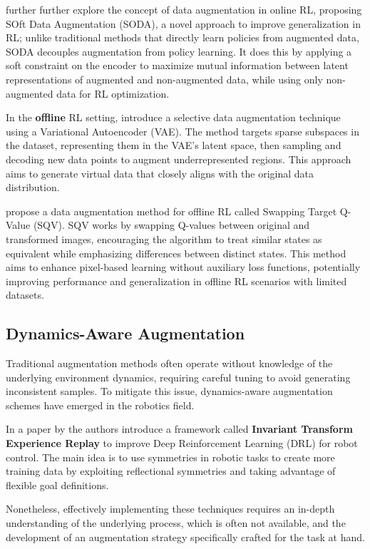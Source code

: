 \cite{hansen2021} further further explore the concept of data augmentation
in online RL, proposing SOft Data Augmentation (SODA),
a novel approach to improve generalization in RL;
unlike traditional methods that directly learn policies
from augmented data, SODA decouples augmentation from policy learning.
It does this by applying a soft constraint on the encoder to
maximize mutual information between latent representations of
augmented and non-augmented data, while using only non-augmented
data for RL optimization.

In the \textbf{offline} RL setting, \cite{han2022}
introduce a selective data augmentation technique
using a Variational Autoencoder (VAE).
The method targets sparse subspaces in the dataset,
representing them in the VAE's latent space,
then sampling and decoding new data points to augment
underrepresented regions. This approach aims to generate
virtual data that closely aligns with the original data distribution.

\cite{joo2022} propose a data augmentation method for offline RL
called Swapping Target Q-Value (SQV).
SQV works by swapping Q-values between original and transformed images,
encouraging the algorithm to treat similar states as equivalent while
emphasizing differences between distinct states.
This method aims to enhance pixel-based learning without auxiliary
loss functions, potentially improving performance and generalization
in offline RL scenarios with limited datasets.

\subsection{Dynamics-Aware Augmentation}

Traditional augmentation methods often operate without
knowledge of the underlying environment dynamics, requiring
careful tuning to avoid generating inconsistent samples.
To mitigate this issue, dynamics-aware augmentation schemes
have emerged in the robotics field.

In a paper by \cite{lin2020} the authors introduce a
framework called
\textbf{Invariant Transform Experience Replay}
to improve Deep Reinforcement Learning (DRL)
for robot control.
The main idea is to use symmetries in robotic
tasks to create more training data by exploiting
reflectional symmetries and taking advantage of
flexible goal definitions.

Nonetheless, effectively implementing these techniques
requires an in-depth understanding
of the underlying process, which is often not available, and
the development of an augmentation strategy specifically
crafted for the task at hand.

